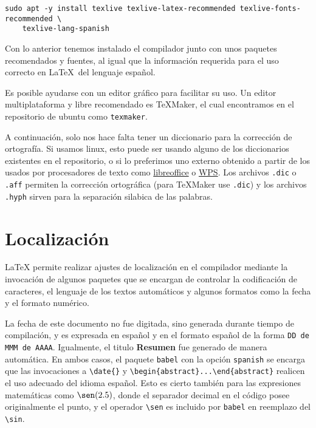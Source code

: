 \documentclass[12pt]{article}
\begin{document}
\begin{verbatim}
sudo apt -y install texlive texlive-latex-recommended texlive-fonts-recommended \
    texlive-lang-spanish
\end{verbatim}

Con lo anterior tenemos instalado el compilador junto con unos paquetes recomendados y fuentes, al igual que la información requerida para el uso correcto en \LaTeX \ del lenguaje español.

Es posible ayudarse con un editor gráfico para facilitar su uso. Un editor multiplataforma y libre recomendado es TeXMaker, el cual encontramos en el repositorio de ubuntu como \verb-texmaker-.

A continuación, solo nos hace falta tener un diccionario para la corrección de ortografía. Si usamos linux, esto puede ser usando alguno de los diccionarios existentes en el repositorio, o si lo preferimos uno externo obtenido a partir de los usados por procesadores de texto como \href{https://www.dropbox.com/sh/y45katzvdjrl7nl/AAAwM89aDOJ_jA_Py3DdFJN8a?dl=0}{libreoffice} o \href{https://www.dropbox.com/sh/y45katzvdjrl7nl/AAAwM89aDOJ_jA_Py3DdFJN8a?dl=0}{WPS}. Los archivos \verb-.dic- o \verb-.aff- permiten la corrección ortográfica (para TeXMaker use \verb-.dic-) y los archivos \verb-.hyph- sirven para la separación silabica de las palabras.

\section{Localización}

LaTeX permite realizar ajustes de localización en el compilador mediante la invocación de algunos paquetes que se encargan de controlar la codificación de caracteres, el lenguaje de los textos automáticos y algunos formatos como la fecha y el formato numérico.

La fecha de este documento no fue digitada, sino generada durante tiempo de compilación, y es expresada en español y en el formato español de la forma \verb-DD de MMM de AAAA-. Igualmente, el titulo \textbf{Resumen} fue generado de manera automática. En ambos casos, el paquete \verb-babel- con la opción \verb-spanish- se encarga que las invocaciones a \verb-\date{}- y \verb-\begin{abstract}...\end{abstract}- realicen el uso adecuado del idioma español. Esto es cierto también para las expresiones matemáticas como $\sen(2.5)$, donde el separador decimal en el código posee originalmente el punto, y el operador \verb-\sen- es incluido por \verb-babel- en reemplazo del \verb-\sin-.
\end{document}

